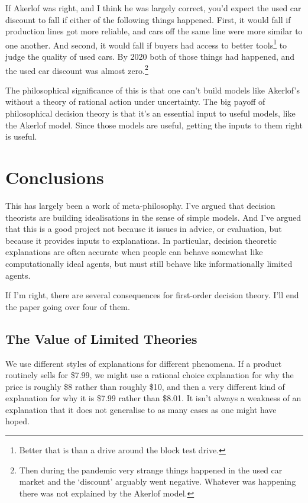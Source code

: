 \documentclass[
  10pt,
  letterpaper,
  DIV=11,
  numbers=noendperiod,
  twoside]{scrartcl}
\begin{document}
If Akerlof was right, and I think he was largely correct, you'd expect
the used car discount to fall if either of the following things
happened. First, it would fall if production lines got more reliable,
and cars off the same line were more similar to one another. And second,
it would fall if buyers had access to better tools\footnote{Better that
  is than a drive around the block test drive.} to judge the quality of
used cars. By 2020 both of those things had happened, and the used car
discount was almost zero.\footnote{Then during the pandemic very strange
  things happened in the used car market and the `discount' arguably
  went negative. Whatever was happening there was not explained by the
  Akerlof model.}

The philosophical significance of this is that one can't build models
like Akerlof's without a theory of rational action under uncertainty.
The big payoff of philosophical decision theory is that it's an
essential input to useful models, like the Akerlof model. Since those
models are useful, getting the inputs to them right is useful.

\section{Conclusions}\label{conclusions}

This has largely been a work of meta-philosophy. I've argued that
decision theorists are building idealisations in the sense of simple
models. And I've argued that this is a good project not because it
issues in advice, or evaluation, but because it provides inputs to
explanations. In particular, decision theoretic explanations are often
accurate when people can behave somewhat like computationally ideal
agents, but must still behave like informationally limited agents.

If I'm right, there are several consequences for first-order decision
theory. I'll end the paper going over four of them.

\subsection{The Value of Limited
Theories}\label{the-value-of-limited-theories}

We use different styles of explanations for different phenomena. If a
product routinely sells for \$7.99, we might use a rational choice
explanation for why the price is roughly \$8 rather than roughly \$10,
and then a very different kind of explanation for why it is \$7.99
rather than \$8.01. It isn't always a weakness of an explanation that it
does not generalise to as many cases as one might have hoped.
\end{document}

